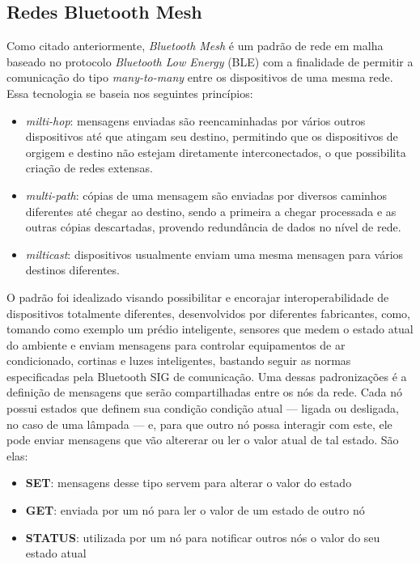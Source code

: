 \documentclass[../monografia.tex]{subfiles}
\begin{document}
\subsection{Redes Bluetooth Mesh}

Como citado anteriormente, \textit{Bluetooth Mesh} é um padrão de rede em malha baseado no protocolo \textit{Bluetooth Low Energy} (BLE) com a finalidade de permitir a comunicação do tipo \textit{many-to-many} entre os dispositivos de uma mesma rede. Essa tecnologia se baseia nos seguintes princípios:

\begin{itemize}
	\item \textit{milti-hop}: mensagens enviadas são reencaminhadas por vários outros dispositivos até que atingam seu destino, permitindo que os dispositivos de orgigem e destino não estejam diretamente interconectados, o que possibilita criação de redes extensas.
	\item \textit{multi-path}: cópias de uma mensagem são enviadas por diversos caminhos diferentes até chegar ao destino, sendo a primeira a chegar processada e as outras cópias descartadas, provendo redundância de dados no nível de rede.
	\item \textit{milticast}: dispositivos usualmente enviam uma mesma mensagen para vários destinos diferentes.
\end{itemize}

O padrão foi idealizado visando possibilitar e encorajar interoperabilidade de dispositivos totalmente diferentes, desenvolvidos por diferentes fabricantes, como, tomando como exemplo um prédio inteligente, sensores que medem o estado atual do ambiente e enviam mensagens para controlar equipamentos de ar condicionado, cortinas e luzes inteligentes, bastando seguir as normas especificadas pela Bluetooth SIG de comunicação. Uma dessas padronizações é a definição de mensagens que serão compartilhadas entre os nós da rede. Cada nó possui estados que definem sua condição condição atual --- ligada ou desligada, no caso de uma lâmpada --- e, para que outro nó possa interagir com este, ele pode enviar mensagens que vão altererar ou ler o valor atual de tal estado. São elas:

\begin{itemize}
	\item \textbf{SET}: mensagens desse tipo servem para alterar o valor do estado
	\item \textbf{GET}: enviada por um nó para ler o valor de um estado de outro nó
	\item \textbf{STATUS}: utilizada por um nó para notificar outros nós o valor do seu estado atual
\end{itemize}
\end{document}
